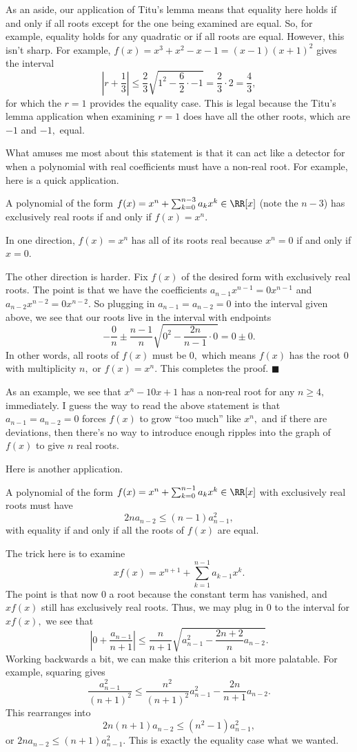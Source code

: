 As an aside, our application of Titu's lemma means that equality here holds if and only if all roots except for the one being examined are equal. So, for example, equality holds for any quadratic or if all roots are equal. However, this isn't sharp. For example, $f(x)=x^3+x^2-x-1=(x-1)(x+1)^2$ gives the interval
\[\left|r+\frac13\right|\le\frac23\sqrt{1^2-\frac62\cdot-1}=\frac23\cdot2=\frac43,\]
for which the $r=1$ provides the equality case. This is legal because the Titu's lemma application when examining $r=1$ does have all the other roots, which are $-1$ and $-1,$ equal.

What amuses me most about this statement is that it can act like a detector for when a polynomial with real coefficients must have a non-real root. For example, here is a quick application.
\begin{proposition}
    A polynomial of the form $f(x)=x^n+\sum_{k=0}^{n-3}a_kx^k\in\RR[x]$ (note the $n-3$) has exclusively real roots if and only if $f(x)=x^n.$
\end{proposition}
In one direction, $f(x)=x^n$ has all of its roots real because $x^n=0$ if and only if $x=0.$

The other direction is harder. Fix $f(x)$ of the desired form with exclusively real roots. The point is that we have the coefficients $a_{n-1}x^{n-1}=0x^{n-1}$ and $a_{n-2}x^{n-2}=0x^{n-2}.$ So plugging in $a_{n-1}=a_{n-2}=0$ into the interval given above, we see that our roots live in the interval with endpoints
\[-\frac0n\pm\frac{n-1}n\sqrt{0^2-\frac{2n}{n-1}\cdot0}=0\pm0.\]
In other words, all roots of $f(x)$ must be $0,$ which means $f(x)$ has the root $0$ with multiplicity $n,$ or $f(x)=x^n.$ This completes the proof. $\blacksquare$

As an example, we see that $x^n-10x+1$ has a non-real root for any $n\ge4,$ immediately. I guess the way to read the above statement is that $a_{n-1}=a_{n-2}=0$ forces $f(x)$ to grow ``too much'' like $x^n,$ and if there are deviations, then there's no way to introduce enough ripples into the graph of $f(x)$ to give $n$ real roots.

Here is another application.
\begin{proposition}
    A polynomial of the form $f(x)=x^n+\sum_{k=0}^{n-1}a_kx^k\in\RR[x]$ with exclusively real roots must have
    \[2na_{n-2}\le(n-1)a_{n-1}^2,\]
    with equality if and only if all the roots of $f(x)$ are equal.
\end{proposition}
The trick here is to examine
\[xf(x)=x^{n+1}+\sum_{k=1}^{n-1}a_{k-1}x^k.\]
The point is that now $0$ a root because the constant term has vanished, and $xf(x)$ still has exclusively real roots. Thus, we may plug in $0$ to the interval for $xf(x),$ we see that
\[\left|0+\frac{a_{n-1}}{n+1}\right|\le\frac n{n+1}\sqrt{a_{n-1}^2-\frac{2n+2}na_{n-2}}.\]
Working backwards a bit, we can make this criterion a bit more palatable. For example, squaring gives
\[\frac{a_{n-1}^2}{(n+1)^2}\le\frac{n^2}{(n+1)^2}a_{n-1}^2-\frac{2n}{n+1}a_{n-2}.\]
This rearranges into
\[2n(n+1)a_{n-2}\le\left(n^2-1\right)a_{n-1}^2,\]
or $2na_{n-2}\le(n+1)a_{n-1}^2.$ This is exactly the equality case what we wanted.

